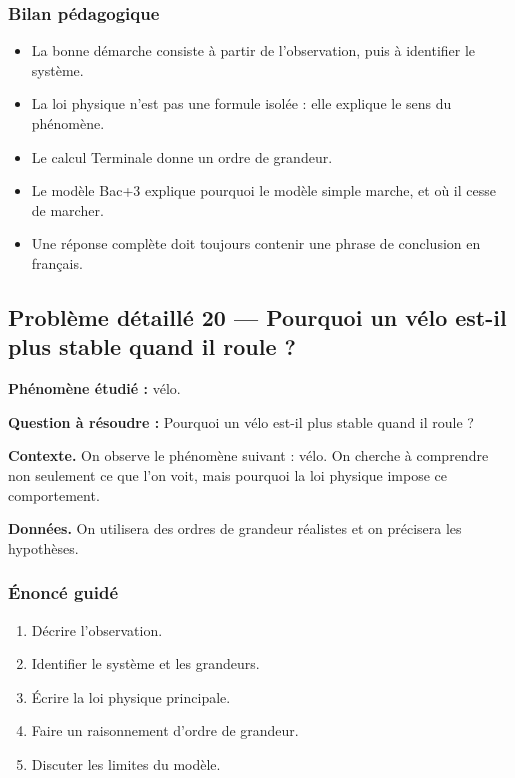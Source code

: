 \documentclass[11pt,a4paper]{article}
\begin{document}
\subsubsection*{Bilan pédagogique}

\begin{methodebox}
\begin{itemize}
  \item La bonne démarche consiste à partir de l'observation, puis à identifier le système.
  \item La loi physique n'est pas une formule isolée : elle explique le sens du phénomène.
  \item Le calcul Terminale donne un ordre de grandeur.
  \item Le modèle Bac+3 explique pourquoi le modèle simple marche, et où il cesse de marcher.
  \item Une réponse complète doit toujours contenir une phrase de conclusion en français.
\end{itemize}
\end{methodebox}

\subsection{Problème détaillé 20 — Pourquoi un vélo est-il plus stable quand il roule ?}

\begin{exercicebox}
\textbf{Phénomène étudié :} vélo.

\medskip
\textbf{Question à résoudre :} Pourquoi un vélo est-il plus stable quand il roule ?

\medskip
\textbf{Contexte.} On observe le phénomène suivant : vélo. On cherche à comprendre non seulement ce que l'on voit, mais pourquoi la loi physique impose ce comportement.

\medskip
\textbf{Données.} On utilisera des ordres de grandeur réalistes et on précisera les hypothèses.
\end{exercicebox}

\subsubsection*{Énoncé guidé}

\begin{enumerate}
  \item Décrire l'observation.
  \item Identifier le système et les grandeurs.
  \item Écrire la loi physique principale.
  \item Faire un raisonnement d'ordre de grandeur.
  \item Discuter les limites du modèle.
\end{enumerate}
\end{document}

